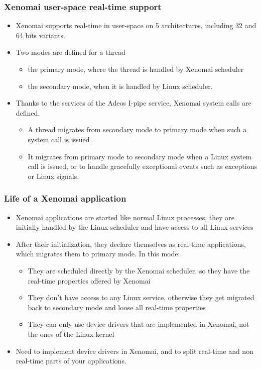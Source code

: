 \begin{frame}
  \frametitle{Xenomai user-space real-time support}
  \begin{itemize}
  \item Xenomai supports real-time in user-space on 5 architectures,
    including 32 and 64 bits variants.
  \item Two modes are defined for a thread
    \begin{itemize}
    \item the primary mode, where the thread is handled by Xenomai
      scheduler
    \item the secondary mode, when it is handled by Linux scheduler.
    \end{itemize}
  \item Thanks to the services of the Adeos I-pipe service, Xenomai
    system calls are defined.
    \begin{itemize}
    \item A thread migrates from secondary mode to primary mode when
      such a system call is issued
    \item It migrates from primary mode to secondary mode when a Linux
      system call is issued, or to handle gracefully exceptional
      events such as exceptions or Linux signals.
    \end{itemize}
  \end{itemize}
\end{frame}

\begin{frame}
  \frametitle{Life of a Xenomai application}
  \begin{itemize}
  \item Xenomai applications are started like normal Linux processes,
    they are initially handled by the Linux scheduler and have access
    to all Linux services
  \item After their initialization, they declare themselves as
    real-time applications, which migrates them to primary mode. In
    this mode:
    \begin{itemize}
    \item They are scheduled directly by the Xenomai scheduler, so
      they have the real-time properties offered by Xenomai
    \item They don't have access to any Linux service, otherwise they
      get migrated back to secondary mode and loose all real-time
      properties
    \item They can only use device drivers that are implemented in
      Xenomai, not the ones of the Linux kernel
    \end{itemize}
  \item Need to implement device drivers in Xenomai, and to split
    real-time and non real-time parts of your applications.
  \end{itemize}
\end{frame}


